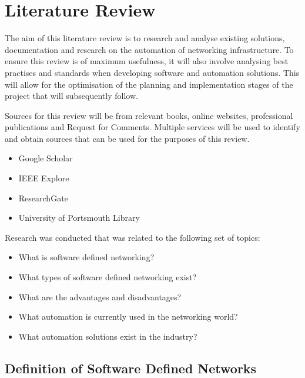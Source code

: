 \chapter{Literature Review}
\label{chap:litreview}
The aim of this literature review is to research and analyse existing
solutions, documentation and research on the automation of networking
infrastructure. To ensure this review is of maximum usefulness, it will also
involve analysing best practises and standards when developing software and
automation solutions. This will allow for the optimisation of the planning and
implementation stages of the project that will subsequently follow.

Sources for this review will be from relevant books, online websites,
professional publications and Request for Comments. Multiple services will be
used to identify and obtain sources that can be used for the purposes of this
review.
\begin{itemize}
    \item Google Scholar
    \item IEEE Explore
    \item ResearchGate
    \item University of Portsmouth Library
\end{itemize}
Research was conducted that was related to the following set of topics:
\begin{itemize}
    \item What is software defined networking?
    \item What types of software defined networking exist?
    \item What are the advantages and disadvantages?
    \item What automation is currently used in the networking world?
    \item What automation solutions exist in the industry?
\end{itemize}

\section{Definition of Software Defined Networks}
\label{litreview:definition}

